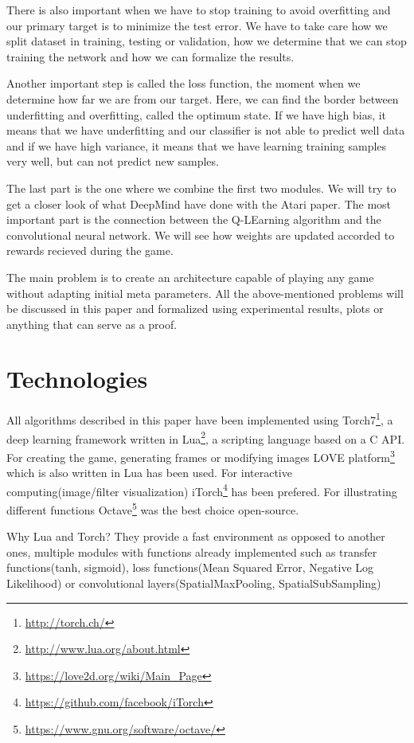 There is also important when we have to stop training to avoid overfitting and our primary target is to minimize the test error. We have to take care how we split dataset in training, testing or validation, how we determine that we can stop training the network and how we can formalize the results.

Another important step is called the loss function, the moment when we determine how far we are from our target. Here, we can find the border between underfitting and overfitting, called the optimum state. If we have high bias, it means that we have underfitting and our classifier is not able to predict well data and if we have high variance, it means that we have learning training samples very well, but can not predict new samples.

The last part is the one where we combine the first two modules. We will try to get a closer look of what DeepMind have done with the Atari paper\cite{atari}. The most important part is the connection between the Q-LEarning algorithm and the convolutional neural network. We will see how weights are updated accorded to rewards recieved during the game.

The main problem is to create an architecture capable of playing any game without adapting initial meta parameters. All the above-mentioned problems will be discussed in this paper and formalized using experimental results, plots or anything that can serve as a proof.
\newpage

\section{Technologies}
\label{sec:technologies}
All algorithms described in this paper have been implemented using Torch7\footnote{\url{http://torch.ch/}}, a deep learning framework written in Lua\footnote{\url{http://www.lua.org/about.html}}, a scripting language based on a C API. For creating the game, generating frames or modifying images LOVE platform\footnote{\url{https://love2d.org/wiki/Main_Page}} which is also written in Lua has been used. For interactive computing(image/filter visualization) iTorch\footnote{\url{https://github.com/facebook/iTorch}} has been prefered. For illustrating different functions Octave\footnote{\url{https://www.gnu.org/software/octave/}} was the best choice open-source.

Why Lua and Torch? They provide a fast environment as opposed to another ones\cite{torch7}, multiple modules with functions already implemented such as transfer functions(tanh, sigmoid), loss functions(Mean Squared Error, Negative Log Likelihood) or convolutional layers(SpatialMaxPooling, SpatialSubSampling)

